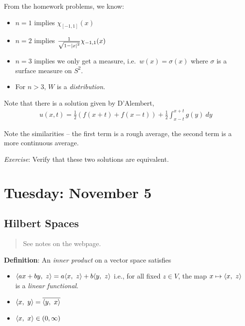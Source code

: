 From the homework problems, we know:

\begin{itemize}
\item
  \(n=1\) implies \(\chi_{[-1, 1]} (x)\)
\item
  \(n = 2\) implies \(\frac{1}{\sqrt{1 - {\left\lvert {x} \right\rvert}^2}} \chi_{-1, 1}(x)\)
\item
  \(n=3\) implies we only get a measure, i.e.~\(w(x) = \sigma(x)\) where
  \(\sigma\) is a surface measure on \(S^2\).
\item
  For \(n > 3\), \(W\) is a \emph{distribution}.
\end{itemize}

Note that there is a solution given by D'Alembert,
\begin{align*}
u(x, t) = \frac{1}{2} ( f(x +t) + f(x - t) ) + \frac{1}{2} \int_{x-t}^{x+t} g(y) ~dy
\end{align*}

Note the similarities -- the first term is a rough average, the second
term is a more continuous average.

\emph{Exercise}: Verify that these two solutions are equivalent.

\hypertarget{tuesday-november-5}{%
\section{Tuesday: November 5}\label{tuesday-november-5}}

\hypertarget{hilbert-spaces}{%
\subsection{Hilbert Spaces}\label{hilbert-spaces}}

\begin{quote}
See notes on the webpage.
\end{quote}

\textbf{Definition}: An \emph{inner product} on a vector space satisfies

\begin{itemize}
\item
  \({\left\langle {ax + by},~{z} \right\rangle} = a {\left\langle {x},~{z} \right\rangle} + b{\left\langle {y},~{z} \right\rangle}\) i.e., for all
  fixed \(z\in V\), the map \(x \mapsto {\left\langle {x},~{z} \right\rangle}\) is a \emph{linear
  functional}.
\item
  \({\left\langle {x},~{y} \right\rangle} = \overline{{\left\langle {y},~{x} \right\rangle}}\)
\item
  \({\left\langle {x},~{x} \right\rangle} \in (0, \infty)\)
\end{itemize}

